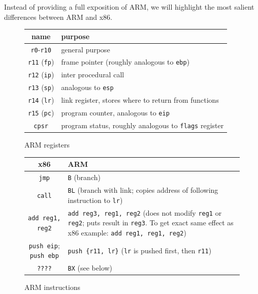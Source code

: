 \documentclass{article}
\newcommand{\xcode}[2]{\colorbox{ubuntuback}{\lstinline[language=#1]|#2|}}
\newcommand{\asm}[1]{\xcode{{[x86masm]assembler}}{#1}}
\newcommand{\code}[1]{\colorbox{ubuntuback}{\texttt{#1}}}
\newcommand{\arm}[1]{\code{#1}}
\begin{document}
Instead of providing a full exposition of ARM, we will highlight the most salient differences between ARM and x86.

\begin{figure}[H]
\centering
    \begin{tabular}{|c|p{}|} 
        \hline
        \textbf{name} & \textbf{purpose} \\
        \hline
        \arm{r0}-\arm{r10} & general purpose \\
        \hline
        \arm{r11} (\arm{fp}) & frame pointer (roughly analogous to \asm{ebp}) \\
        \hline
        \arm{r12} (\arm{ip}) & inter procedural call \\
        \hline
        \arm{r13} (\arm{sp}) & analogous to \asm{esp} \\
        \hline
        \arm{r14} (\arm{lr}) & link register, stores where to return from functions \\
        \hline
        \arm{r15} (\arm{pc}) & program counter, analogous to \asm{eip} \\
        \hline
        \arm{cpsr} & program status, roughly analogous to \asm{flags} register \\
        \hline
    \end{tabular}
\caption{ARM registers}
\end{figure}

\begin{figure}[H]
\centering
    \begin{tabular}{|c|p{}|} 
        \hline
        \textbf{x86} & \textbf{ARM} \\
        \hline
        \asm{jmp} & \arm{B} (branch) \\
        \hline
        \asm{call} & \arm{BL} (branch with link; copies address of following instruction to \arm{lr}) \\
        \hline
        \asm{add reg1, reg2} & \arm{add reg3, reg1, reg2} (does not modify \arm{reg1} or \arm{reg2}; puts result in \arm{reg3}. To get exact same effect as x86 example: \arm{add reg1, reg1, reg2}) \\
        \hline
        \asm{push eip}; \asm{push ebp} & \arm{push \{r11, lr\}} (\arm{lr} is pushed first, then \arm{r11}) \\
        \hline
        \asm{????} & \arm{BX} (see below) \\
        \hline
    \end{tabular}
\caption{ARM instructions}
\end{figure}
\end{document}
